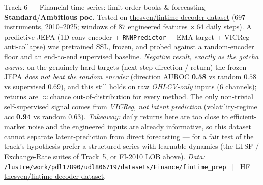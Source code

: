 \documentclass{article}
\newcommand{\code}[1]{\texttt{\small #1}}
\newcommand{\diffmed}{\colorbox{ebamber!18}{\textcolor{ebamber}{\small\bfseries Standard}}}
\newcommand{\diffhard}{\colorbox{ebred!15}{\textcolor{ebred}{\small\bfseries Ambitious}}}
\begin{document}
\begin{trackbox}{Track 6 --- Financial time series: limit order books \& forecasting \hfill \diffmed{}/\diffhard{}}
\smallskip
\textbf{poc.} Tested on
\href{https://huggingface.co/datasets/thesven/fintime-decoder-dataset}{thesven/fintime-decoder-dataset}
(697 instruments, 2010--2025; windows of $87$ engineered features $\times\,64$ daily steps).
A predictive JEPA (1D conv encoder + \code{RNNPredictor} + EMA target + VICReg anti-collapse)
was pretrained SSL, frozen, and probed against a random-encoder floor and an end-to-end
supervised baseline. \emph{Negative result, exactly as the gotcha warns:} on the genuinely
hard targets (next-step direction / return) the frozen JEPA \emph{does not beat the random
encoder} (direction AUROC \textbf{0.58} vs random $0.58$ vs supervised $0.69$), and this
still holds on raw \emph{OHLCV-only} inputs (6 channels); returns are $\approx$chance
out-of-distribution for every method. The only non-trivial self-supervised signal comes
from \emph{VICReg, not latent prediction} (volatility-regime acc \textbf{0.94} vs random
$0.63$). \emph{Takeaway:} daily returns here are too close to efficient-market noise and the
engineered inputs are already informative, so this dataset cannot separate latent-prediction
from direct forecasting --- for a fair test of the track's hypothesis prefer a structured
series with learnable dynamics (the LTSF / Exchange-Rate suites of Track~5, or FI-2010 LOB
above).
\emph{Data:} \code{/lustre/work/pdl17890/udl806719/datasets/Finance/fintime\_prep}
~|~ HF \href{https://huggingface.co/datasets/thesven/fintime-decoder-dataset}{thesven/fintime-decoder-dataset}.
\end{trackbox}
\end{document}
